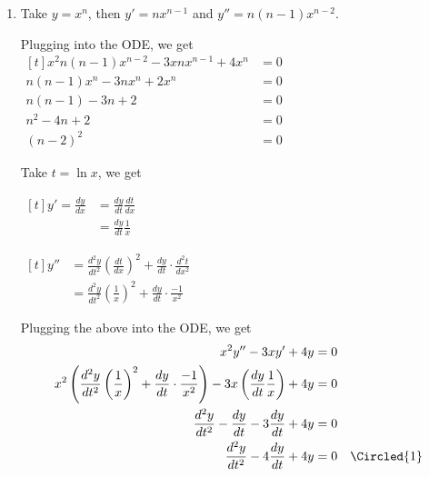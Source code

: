 \begin{enumerate}
    \item Take $y = x^n$, then $y' = nx^{n-1}$ and $y'' = n(n-1)x^{n-2}$. 
    
    Plugging into the ODE, we get $\begin{aligned}[t]
        x^2n(n - 1)x^{n-2} - 3xnx^{n-1} + 4x^n & = 0 \\
        n(n - 1)x^n - 3nx^n + 2x^n             & = 0 \\
        n(n-1) - 3n + 2                        & = 0 \\
        n^2 - 4n + 2                           & = 0 \\
        (n - 2)^2                              & = 0
    \end{aligned}$

    Take $t = \ln x$, we get 

    \begin{minipage}[t]{0.45\linewidth}
        $\begin{aligned}[t]
            y' = \frac{dy}{dx} & = \frac{dy}{dt} \frac{dt}{dx} \\
                               & = \frac{dy}{dt} \frac{1}{x}
        \end{aligned}$
    \end{minipage}
    \begin{minipage}[t]{0.45\linewidth}
        $\begin{aligned}[t]
            y'' 
            & = \frac{d^2y}{dt^2}\left( \frac{dt}{dx} \right)^2 + \frac{dy}{dt} \cdot \frac{d^2t}{dx^2} \\
            &= \frac{d^2y}{dt^2} \left( \frac{1}{x} \right)^2 + \frac{dy}{dt} \cdot \frac{-1}{x^2}
        \end{aligned}$
    \end{minipage}

    Plugging the above into the ODE, we get 
    \begin{align*}
        x^2y'' - 3xy' + 4y & = 0 \\
        x^2 \left( \frac{d^2y}{dt^2} \left( \frac{1}{x} \right)^2 + \frac{dy}{dt} \cdot \frac{-1}{x^2} \right) - 3x \left( \frac{dy}{dt} \frac{1}{x} \right) + 4y & = 0 \\
        \frac{d^2y}{dt^2} - \frac{dy}{dt} - 3\frac{dy}{dt} + 4y & = 0 \\
        \frac{d^2y}{dt^2} - 4\frac{dy}{dt} + 4y & = 0 & \Circled{1}
    \end{align*}


\end{enumerate}
